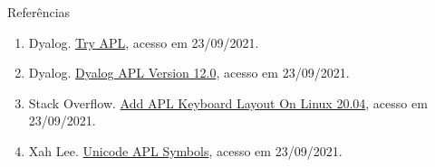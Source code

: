 \begin{frame}[fragile]{Referências}

    \begin{enumerate}
        \item Dyalog. \href{https://tryapl.org/}{Try APL}, acesso em 23/09/2021.

        \item Dyalog. \href{https://help.dyalog.com/12.0/index.html}{Dyalog APL Version 12.0}, acesso em 23/09/2021.
 
        \item Stack Overflow. \href{https://stackoverflow.com/questions/68065520/add-apl-keyboard-layout-on-linux-20-04}{Add APL Keyboard Layout On Linux 20.04}, acesso em 23/09/2021.

        \item Xah Lee. \href{http://xahlee.info/comp/unicode_APL_symbols.html}{Unicode APL Symbols}, acesso em 23/09/2021.

    \end{enumerate}

\end{frame}
